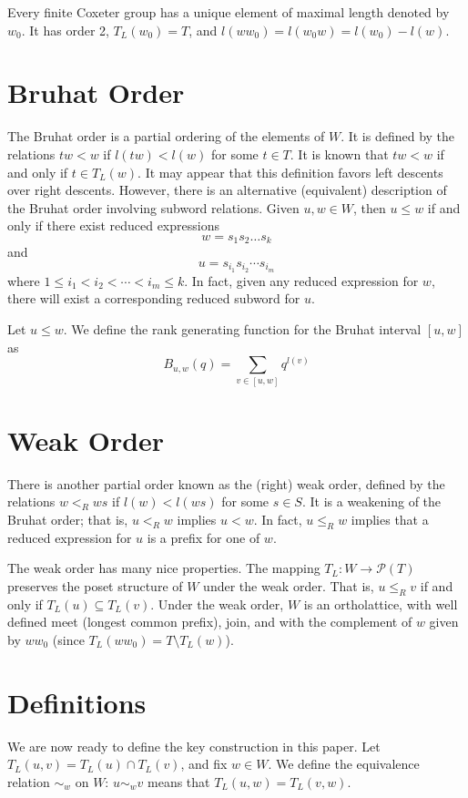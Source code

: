 \documentclass[10pt]{amsart}
\theoremstyle{definition}
\theoremstyle{definition}
\begin{document}
Every finite Coxeter group has a unique element of maximal length denoted by $w_0$. It has order 2, $T_L(w_0) = T$, and $l(ww_0) = l(w_0w) = l(w_0) - l(w)$.

\section{Bruhat Order}
The Bruhat order is a partial ordering of the elements of $W$. It is defined by the relations $tw < w$ if $l(tw) < l(w)$ for some $t \in T$. It is known that $tw < w$ if and only if $t \in T_L(w)$. It may appear that this definition favors left descents over right descents. However, there is an alternative (equivalent) description of the Bruhat order involving subword relations. Given $u, w \in W$, then $u\leq w$ if and only if there exist reduced expressions
\[
w = s_1s_2\ldots s_k
\]
and
\[
u = s_{i_1}s_{i_2}\cdots s_{i_m}
\]
where $1 \leq i_1 < i_2 < \cdots < i_m \leq k$. In fact, given any reduced expression for $w$, there will exist a corresponding reduced subword for $u$.

Let $u \leq w$. We define the rank generating function for the Bruhat interval $[u, w]$ as
\[
B_{u, w}(q) = \sum_{v \in [u, w]} q^{l(v)}
\]

\section{Weak Order}
There is another partial order known as the (right) weak order, defined by the relations $w <_R ws$ if $l(w) < l(ws)$ for some $s \in S$. It is a weakening of the Bruhat order; that is, $u <_R w$ implies $u < w$. In fact, $u \leq_R w$ implies that a reduced expression for $u$ is a prefix for one of $w$.

The weak order has many nice properties. The mapping $T_L : W \rightarrow \mathcal{P}(T)$ preserves the poset structure of $W$ under the weak order. That is, $u \leq_R v$ if and only if $T_L(u) \subseteq T_L(v)$. Under the weak order, $W$ is an ortholattice, with well defined meet (longest common prefix), join, and with the complement of $w$ given by $ww_0$ (since $T_L(ww_0) = T \setminus T_L(w)$). 

\section{Definitions}
We are now ready to define the key construction in this paper. Let $T_L(u, v) = T_L(u) \cap T_L(v)$, and fix $w \in W$. We define the equivalence relation $\sim_w$ on $W$: $u\sim_w v$ means that $T_L(u, w) = T_L(v, w)$.
\end{document}
